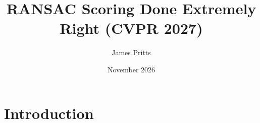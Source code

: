\documentclass{article}
\title{RANSAC Scoring Done Extremely Right (CVPR 2027)}
\author{James Pritts}
\date{November 2026}
\begin{document}
\maketitle

\section{Introduction}
\end{document}
